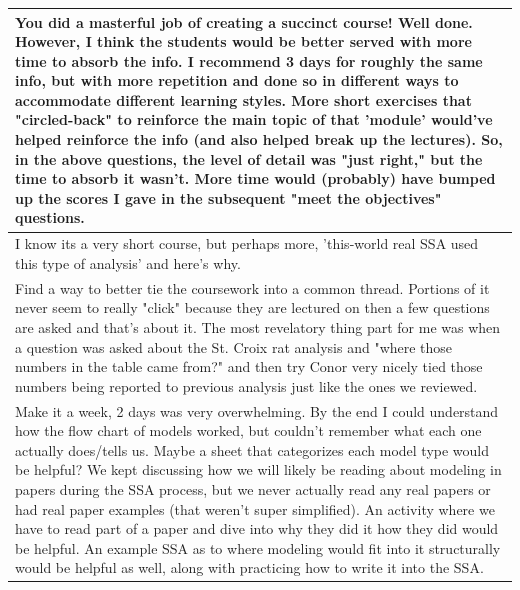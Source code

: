 \documentclass[]{article}
\begin{document}
\begin{table}[H]
\begin{tabular}{l}
\hline
You did a masterful job of creating a succinct course! Well done. However, I think the students would be better served with more time to absorb the info. I recommend 3 days for roughly the same info, but with more repetition and done so in different ways to accommodate different learning styles. More short exercises that "circled-back" to reinforce the main topic of that 'module' would've helped reinforce the info (and also helped break up the lectures). So, in the above questions, the level of detail was "just right," but the time to absorb it wasn't. More time would (probably) have bumped up the scores I gave in the subsequent "meet the objectives" questions.\\
\hline
I know its a very short course, but perhaps more, 'this-world real SSA used this type of analysis' and here's why.\\
\hline
Find a way to better tie the coursework into a common thread. Portions of it never seem to really "click" because they are lectured on then a few questions are asked and that's about it. The most revelatory thing part for me was when a question was asked about the St. Croix rat analysis and "where those numbers in the table came from?" and then try Conor very nicely tied those numbers being reported to previous analysis just like the ones we reviewed.\\
\hline
Make it a week, 2 days was very overwhelming. By the end I could understand how the flow chart of models worked, but couldn't remember what each one actually does/tells us. Maybe a sheet that categorizes each model type would be helpful? We kept discussing how we will likely be reading about modeling in papers during the SSA process, but we never actually read any real papers or had real paper examples (that weren't super simplified). An activity where we have to read part of a paper and dive into why they did it how they did would be helpful. An example SSA as to where modeling would fit into it structurally would be helpful as well, along with practicing how to write it into the SSA.\\
\hline
\end{tabular}
\end{table}
\end{document}
